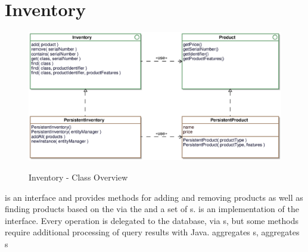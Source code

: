 \newpage
\section{Inventory}

\begin{figure}[ht]
	\centering
  \includegraphics[width=1.0\textwidth]{images/Inventory_Overview.eps}
	\label{inventory_overview}
	\caption{Inventory - Class Overview}
\end{figure}


 is an interface and provides methods for adding and removing products as well as finding products based on the  via the  and a set of s.
 is an implementation of the  interface. Every operation is delegated to the database, via s, but some methods require additional processing of query results with Java.
 aggregates s,  aggregates s 

